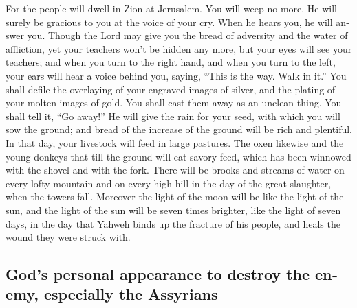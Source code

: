 \begin{paracol}{2}
\begin{otherlanguage}{english}
 For the people will dwell in Zion at Jerusalem. You will
weep no more. He will surely be gracious to you at the voice of your
cry. When he hears you, he will answer you.  Though the
Lord may give you the bread of adversity and the water of affliction,
yet your teachers won't be hidden any more, but your eyes will see your
teachers;  and when you turn to the right hand, and when
you turn to the left, your ears will hear a voice behind you, saying,
``This is the way. Walk in it.''  You shall defile the
overlaying of your engraved images of silver, and the plating of your
molten images of gold. You shall cast them away as an unclean thing. You
shall tell it, ``Go away!''  He will give the rain for
your seed, with which you will sow the ground; and bread of the increase
of the ground will be rich and plentiful. In that day, your livestock
will feed in large pastures.  The oxen likewise and the
young donkeys that till the ground will eat savory feed, which has been
winnowed with the shovel and with the fork.  There will
be brooks and streams of water on every lofty mountain and on every high
hill in the day of the great slaughter, when the towers fall.
 Moreover the light of the moon will be like the light of
the sun, and the light of the sun will be seven times brighter, like the
light of seven days, in the day that Yahweh binds up the fracture of his
people, and heals the wound they were struck with.

\hypertarget{gods-personal-appearance-to-destroy-the-enemy-especially-the-assyrians}{%
\subsection{God's personal appearance to destroy the enemy, especially
the
Assyrians}\label{gods-personal-appearance-to-destroy-the-enemy-especially-the-assyrians}}


\end{otherlanguage}
\end{paracol}
